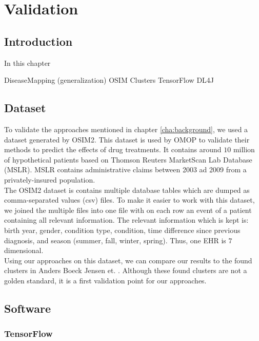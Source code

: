 \graphicspath{ {Implementation/Images/} }


\chapter{Validation}
\label{cha:implementation}

\section{Introduction}
In this chapter 

DiseaseMapping (generalization)
OSIM
Clusters
TensorFlow
DL4J


\section{Dataset}

To validate the approaches mentioned in chapter \ref{cha:background}, we used a dataset generated by OSIM2. This dataset is used by OMOP to validate their methods to predict the effects of drug treatments. It contains around $10$ million of hypothetical patients based on Thomson Reuters MarketScan Lab Database (MSLR). MSLR contains administrative claims between 2003 ad 2009 from a privately-insured population. \\

The OSIM2 dataset is contains multiple database tables which are dumped as comma-separated values (csv) files. To make it easier to work with this dataset, we joined the multiple files into one file with on each row an event of a patient containing all relevant information. The relevant information which is kept is: birth year, gender, condition type, condition, time difference since previous diagnosis, and season (summer, fall, winter, spring). Thus, one EHR is $7$ dimensional. \\	

Using our approaches on this dataset, we can compare our results to the found clusters in Anders Boeck Jensen et. \cite{Brunak:article}. Although these found clusters are not a golden standard, it is a first validation point for our approaches.


\section{Software}

\subsection{TensorFlow}

